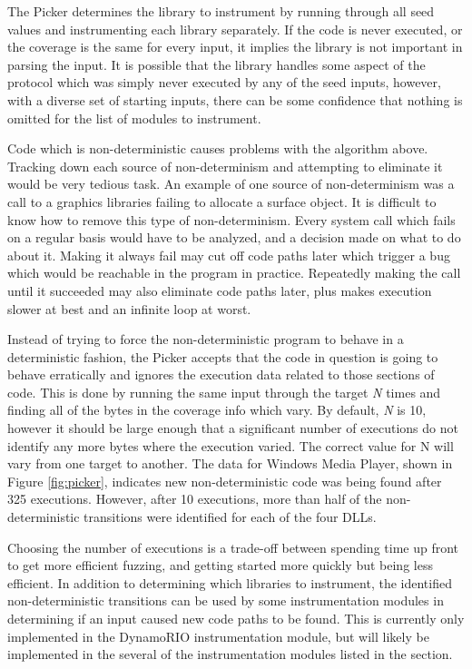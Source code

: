 The Picker determines the library to instrument by running through all seed values and instrumenting each
library separately. If the code is never executed, or the coverage is the
same for every input, it implies the library is not important in parsing the
input.  It is possible that the library handles some aspect of the
protocol which was simply never executed by any of the seed inputs, however,
with a diverse set of starting inputs, there can be some confidence that
nothing is omitted for the list of modules to instrument.

Code which is non-deterministic causes problems with the algorithm above.
Tracking down each source of non-determinism and attempting to eliminate it
would be very tedious task. An example of one source of non-determinism was a
call to a graphics libraries failing to allocate a surface object. It is
difficult to know how to remove this type of non-determinism. Every system call
which fails on a regular basis would have to be analyzed, and a decision made
on what to do about it.  Making it always fail may cut off code paths later
which trigger a bug which would be reachable in the program in practice.
Repeatedly making the call until it succeeded may also eliminate code paths
later, plus makes execution slower at best and an infinite loop at worst.

Instead of trying to force the non-deterministic program to behave in a
deterministic fashion, the Picker accepts that the code in question is
going to behave erratically and ignores the execution data related to those
sections of code.  This is done by running the same input through the target
\textit{N} times and finding all of the bytes in the coverage info which
vary. By default, \textit{N} is 10, however it should be large enough that a
significant number of executions do not identify any more bytes where the
execution varied. The correct value for N will vary from one target to another.
The data for Windows Media Player, shown in Figure \ref{fig:picker}, indicates
new non-deterministic code was being found after 325 executions. However, after
10 executions, more than half of the non-deterministic transitions were
identified for each of the four DLLs.

Choosing the number of executions is a trade-off between spending time up front
to get more efficient fuzzing, and getting started more quickly but being less
efficient.  In addition to determining which libraries to instrument, the
identified non-deterministic transitions can be used by some instrumentation
modules in determining if an input caused new code paths to be found.  This is
currently only implemented in the DynamoRIO instrumentation module, but will
likely be implemented in the several of the instrumentation modules listed in
the  section.

